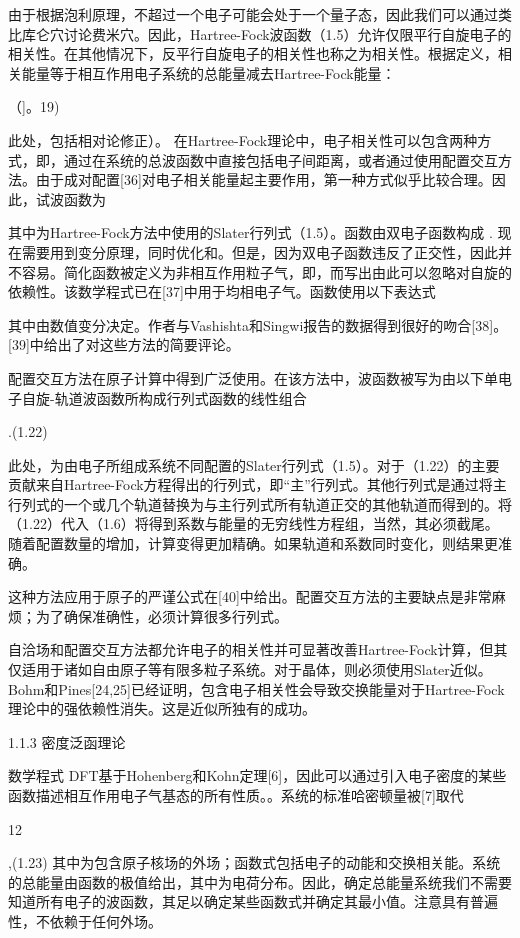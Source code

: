 由于根据泡利原理，不超过一个电子可能会处于一个量子态，因此我们可以通过类比库仑穴讨论费米穴。因此，Hartree-Fock波函数（1.5）允许仅限平行自旋电子的相关性。在其他情况下，反平行自旋电子的相关性也称之为相关性。根据定义，相关能量等于相互作用电子系统的总能量减去Hartree-Fock能量：

（]。19)

此处，包括相对论修正）。
在Hartree-Fock理论中，电子相关性可以包含两种方式，即，通过在系统的总波函数中直接包括电子间距离，或者通过使用配置交互方法。由于成对配置[36]对电子相关能量起主要作用，第一种方式似乎比较合理。因此，试波函数为





其中为Hartree-Fock方法中使用的Slater行列式（1.5）。函数由双电子函数构成
. 
现在需要用到变分原理，同时优化和。但是，因为双电子函数违反了正交性，因此并不容易。简化函数被定义为非相互作用粒子气，即，而写出由此可以忽略对自旋的依赖性。该数学程式已在[37]中用于均相电子气。函数使用以下表达式

其中由数值变分决定。作者与Vashishta和Singwi报告的数据得到很好的吻合[38]。[39]中给出了对这些方法的简要评论。

配置交互方法在原子计算中得到广泛使用。在该方法中，波函数被写为由以下单电子自旋-轨道波函数所构成行列式函数的线性组合

.(1.22)

此处，为由电子所组成系统不同配置的Slater行列式（1.5）。对于（1.22）的主要贡献来自Hartree-Fock方程得出的行列式，即“主”行列式。其他行列式是通过将主行列式的一个或几个轨道替换为与主行列式所有轨道正交的其他轨道而得到的。将（1.22）代入（1.6）将得到系数与能量的无穷线性方程组，当然，其必须截尾。随着配置数量的增加，计算变得更加精确。如果轨道和系数同时变化，则结果更准确。

这种方法应用于原子的严谨公式在[40]中给出。配置交互方法的主要缺点是非常麻烦；为了确保准确性，必须计算很多行列式。

自洽场和配置交互方法都允许电子的相关性并可显著改善Hartree-Fock计算，但其仅适用于诸如自由原子等有限多粒子系统。对于晶体，则必须使用Slater近似。Bohm和Pines[24,25]已经证明，包含电子相关性会导致交换能量对于Hartree-Fock理论中的强依赖性消失。这是近似所独有的成功。

1.1.3  密度泛函理论 

数学程式 DFT基于Hohenberg和Kohn定理[6]，因此可以通过引入电子密度的某些函数描述相互作用电子气基态的所有性质。。系统的标准哈密顿量被[7]取代


12



,(1.23)
其中为包含原子核场的外场；函数式包括电子的动能和交换相关能。系统的总能量由函数的极值给出，其中为电荷分布。因此，确定总能量系统我们不需要知道所有电子的波函数，其足以确定某些函数式并确定其最小值。注意具有普遍性，不依赖于任何外场。

